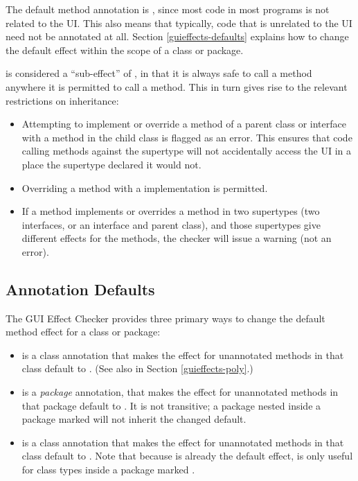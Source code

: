 The default method annotation is , since most code in most programs is not related
to the UI.  This also means that typically, code that is unrelated to the UI need not be annotated
at all.  Section \ref{guieffects-defaults} explains how to change the default effect within the
scope of a class or package.

 is considered a ``sub-effect'' of , in that it is always safe to
call a  method anywhere it is permitted to call a  method.  This
in turn gives rise to the relevant restrictions on inheritance:
\begin{itemize}
\item Attempting to implement or override a  method of a parent class or interface
with a  method in the child class is flagged as an error.  This ensures that
code calling methods against the supertype will not accidentally access the UI in a place the
supertype declared it would not.
\item Overriding a  method with a  implementation is permitted.
\item If a method implements or overrides a method in two supertypes (two interfaces, or an
interface and parent class), and those supertypes give different effects for the methods, the
checker will issue a warning (not an error).
\end{itemize}

\subsection{Annotation Defaults\label{guieffects-defaults}}
The GUI Effect Checker provides three primary ways to change the default method effect for a class
or package:
\begin{itemize}
\item {} is a class annotation that makes the effect for unannotated methods in that
class default to
.  (See also  in Section \ref{guieffects-poly}.)
\item {} is a \emph{package} annotation, that makes the effect for unannotated
methods in that package default to .  It is not transitive; a package nested inside
a package marked  will not inherit the changed default.
\item {} is a class annotation that makes the effect for unannotated methods in that
class default to .  Note that because  is already the default
effect,  is only useful for class types inside a package marked .
\end{itemize}

